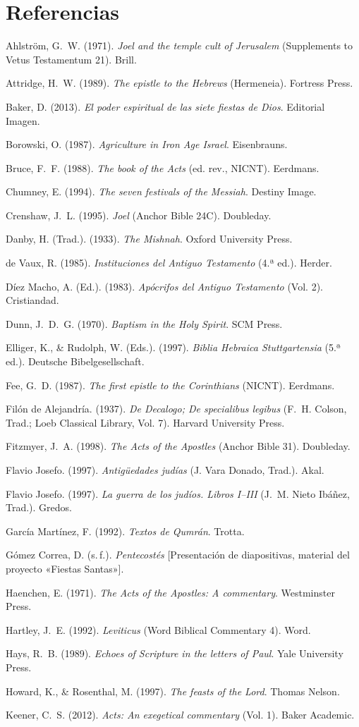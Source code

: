 \documentclass[11pt,letterpaper]{article}
\newcommand{\refapa}[1]{\par{\RaggedRight\hangindent=1.27cm\hangafter=1\noindent #1\par}\vspace{4pt}}
\begin{document}
\section*{Referencias}
\footnotesize\linespread{1.0}\selectfont
\refapa{Ahlström, G.~W. (1971). \emph{Joel and the temple cult of Jerusalem} (Supplements to Vetus Testamentum 21). Brill.}
\refapa{Attridge, H.~W. (1989). \emph{The epistle to the Hebrews} (Hermeneia). Fortress Press.}
\refapa{Baker, D. (2013). \emph{El poder espiritual de las siete fiestas de Dios}. Editorial Imagen.}
\refapa{Borowski, O. (1987). \emph{Agriculture in Iron Age Israel}. Eisenbrauns.}
\refapa{Bruce, F.~F. (1988). \emph{The book of the Acts} (ed. rev., NICNT). Eerdmans.}
\refapa{Chumney, E. (1994). \emph{The seven festivals of the Messiah}. Destiny Image.}
\refapa{Crenshaw, J.~L. (1995). \emph{Joel} (Anchor Bible 24C). Doubleday.}
\refapa{Danby, H. (Trad.). (1933). \emph{The Mishnah}. Oxford University Press.}
\refapa{de Vaux, R. (1985). \emph{Instituciones del Antiguo Testamento} (4.ª ed.). Herder.}
\refapa{Díez Macho, A. (Ed.). (1983). \emph{Apócrifos del Antiguo Testamento} (Vol. 2). Cristiandad.}
\refapa{Dunn, J.~D.~G. (1970). \emph{Baptism in the Holy Spirit}. SCM Press.}
\refapa{Elliger, K., \& Rudolph, W. (Eds.). (1997). \emph{Biblia Hebraica Stuttgartensia} (5.ª ed.). Deutsche Bibelgesellschaft.}
\refapa{Fee, G.~D. (1987). \emph{The first epistle to the Corinthians} (NICNT). Eerdmans.}
\refapa{Filón de Alejandría. (1937). \emph{De Decalogo; De specialibus legibus} (F.~H. Colson, Trad.; Loeb Classical Library, Vol. 7). Harvard University Press.}
\refapa{Fitzmyer, J.~A. (1998). \emph{The Acts of the Apostles} (Anchor Bible 31). Doubleday.}
\refapa{Flavio Josefo. (1997). \emph{Antigüedades judías} (J. Vara Donado, Trad.). Akal.}
\refapa{Flavio Josefo. (1997). \emph{La guerra de los judíos. Libros I--III} (J.~M. Nieto Ibáñez, Trad.). Gredos.}
\refapa{García Martínez, F. (1992). \emph{Textos de Qumrán}. Trotta.}
\refapa{Gómez Correa, D. (s.\,f.). \emph{Pentecostés} [Presentación de diapositivas, material del proyecto «Fiestas Santas»].}
\refapa{Haenchen, E. (1971). \emph{The Acts of the Apostles: A commentary}. Westminster Press.}
\refapa{Hartley, J.~E. (1992). \emph{Leviticus} (Word Biblical Commentary 4). Word.}
\refapa{Hays, R.~B. (1989). \emph{Echoes of Scripture in the letters of Paul}. Yale University Press.}
\refapa{Howard, K., \& Rosenthal, M. (1997). \emph{The feasts of the Lord}. Thomas Nelson.}
\refapa{Keener, C.~S. (2012). \emph{Acts: An exegetical commentary} (Vol. 1). Baker Academic.}
\end{document}
